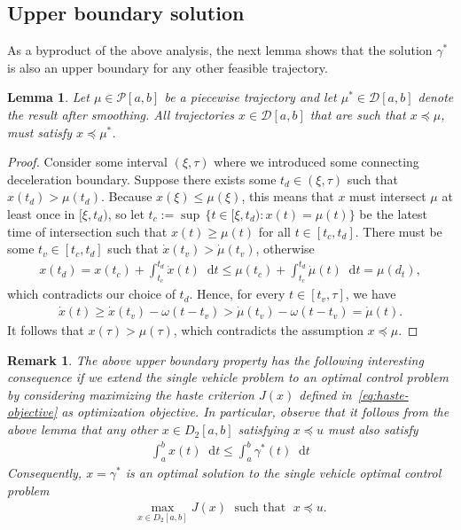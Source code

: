 \documentclass[a4paper]{report}
\newcommand{\comment}[1]{\pdfmargincomment[author=Jeroen van Riel]{#1}}
\theoremstyle{definition}
\theoremstyle{plain}
\newtheorem{lemma}{Lemma}[chapter]
\newtheorem{remark}{Remark}[chapter]
\newcommand\halfopen[2]{\ensuremath{[#1,#2)}}
\newcommand*\diff{\mathop{}\!\mathrm{d}}
\begin{document}
\subsection{Upper boundary solution}\label{sec:upper-bound-property}

As a byproduct of the above analysis, the next lemma shows that the solution
$\gamma^{*}$ is also an upper boundary for any other feasible trajectory.

\begin{lemma}\label{lemma:upperbound}
  Let $\mu \in \mathcal{P}[a,b]$ be a piecewise trajectory and let
  $\mu^{*} \in \mathcal{D}[a,b]$ denote the result after smoothing. All
  trajectories $x \in \mathcal{D}[a, b]$ that are such that
  $x \preceq \mu$, must satisfy $x \preceq \mu^{*}$.
  \comment{Is this argument clear enough?}
\end{lemma}
\begin{proof}
  Consider some interval $(\xi, \tau)$ where we introduced some connecting
  deceleration boundary. Suppose there exists some $t_{d} \in (\xi, \tau)$ such that
  $x(t_{d}) > \mu(t_{d})$. Because $x(\xi) \leq \mu(\xi)$, this means that $x$ must
  intersect $\mu$ at least once in $\halfopen{\xi}{t_{d}}$, so let
  $t_{c} := \sup \, \{ t \in \halfopen{\xi}{t_{d}} : x(t) = \mu(t) \}$ be the latest
  time of intersection such that $x(t) \geq \mu(t)$ for all $t \in [t_{c}, t_{d}]$.
  There must be some $t_{v} \in [t_{c}, t_{d}]$ such that $\dot{x}(t_{v}) > \dot{\mu}(t_{v})$,
  otherwise
  \begin{align*}
    x(t_{d}) = x(t_{c}) + \int_{t_{c}}^{t_{d}} \dot{x}(t) \diff t \leq \mu(t_{c}) + \int_{t_{c}}^{t_{d}} \dot{\mu}(t) \diff t = \mu(d_{t}) ,
  \end{align*}
  which contradicts our choice of $t_{d}$. Hence, for every
  $t \in [t_{v}, \tau]$, we have
  \begin{align*}
    \dot{x}(t) \geq \dot{x}(t_{v}) - \omega (t - t_{v}) > \dot{\mu}(t_{v}) - \omega(t - t_{v}) = \dot{\mu}(t) .
  \end{align*}
  It follows that $x(\tau) > \mu(\tau)$, which contradicts the assumption
  $x \preceq \mu$.
\end{proof}

\begin{remark}
  The above upper boundary property has the following interesting consequence if
  we extend the single vehicle problem to an optimal control problem by
  considering maximizing the haste criterion $J(x)$ defined
  in~\eqref{eq:haste-objective} as optimization objective.
  In particular, observe that it follows from the above lemma that any other
  $x \in D_{2}[a,b]$ satisfying $x \preceq u$ must also satisfy
  \begin{align}
    \int_{a}^{b} x(t) \diff t \leq \int_{a}^{b} \gamma^{*}(t) \diff t
  \end{align}
  Consequently, $x = \gamma^{*}$ is an optimal solution to the single vehicle
  optimal control problem
  \begin{align}
    \max_{x \in D_{2}[a,b]} J(x) \; \text{ such that } \; x \preceq u .
  \end{align}

\end{remark}
\end{document}

